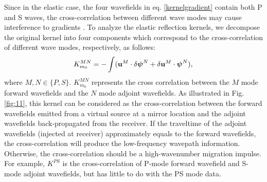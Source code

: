Since in the elastic case, the four wavefields in eq. \eqref{kernelgradient} contain both P and S
waves, the cross-correlation between different wave modes may cause interference to
gradients \cite[]{Wang2017}.
To analyze the elastic reflection kernels, 
we decompose the original kernel into four components which 
correspond to the cross-correlation of different wave modes, respectively, as follows:
\begin{equation}
    K_{m_0}^{MN}     
    =-\int(\mathbf{u}^M\cdot\delta \boldsymbol{\psi}^N
    +\delta  \mathbf{u}^M\cdot\boldsymbol{\psi}^N),\\
    \label{eq:decompkernel} 
\end{equation}
where $M,N\in\{P,S\}$.
$K_{m_0}^{MN}$ represents the cross correlation between the $M$ mode forward wavefields and the 
$N$ mode adjoint wavefields. 
As illustrated in {\color{red}Fig. \ref{fig:11}}, this
kernel can be considered as the cross-correlation between the forward wavefields
emitted from a virtual source at a mirror location and the adjoint wavefields
back-propagated from the receiver. If the traveltime of the adjoint wavefields (injected at
receiver) approximately equals to the forward wavefields, the cross-correlation will
produce the low-frequency wavepath information. Otherwise, the cross-correlation
should be a high-wavenumber migration impulse. For example, $K^{PS}$ is the
cross-correlation of P-mode forward wavefield and S-mode adjoint wavefields, but has
little to do with the PS mode data.

